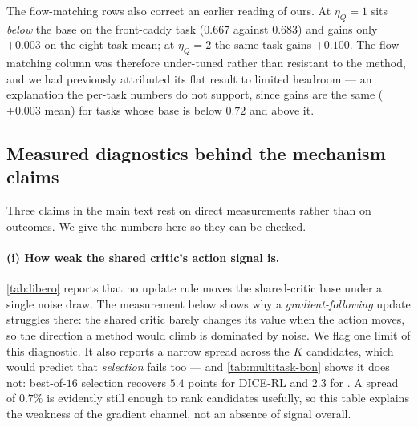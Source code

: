 The flow-matching rows also correct an earlier reading of ours. At
$\eta_Q{=}1$ \method{} sits \emph{below} the base on the front-caddy task
($0.667$ against $0.683$) and gains only $+0.003$ on the eight-task mean; at
$\eta_Q{=}2$ the same task gains $+0.100$. The flow-matching column was
therefore under-tuned rather than resistant to the method, and we had
previously attributed its flat result to limited headroom --- an explanation
the per-task numbers do not support, since gains are the same
($+0.003$ mean) for tasks whose base is below $0.72$ and above it.

\subsection{Measured diagnostics behind the mechanism claims}
\label{app:diagnostics}

Three claims in the main text rest on direct measurements rather than on
outcomes. We give the numbers here so they can be checked.

\paragraph{(i) How weak the shared critic's action signal is.}
\cref{tab:libero} reports that no update rule moves the shared-critic base
under a single noise draw. The measurement below shows why a
\emph{gradient-following} update struggles there: the shared critic barely
changes its value when the action moves, so the direction a method would climb
is dominated by noise. We flag one limit of this diagnostic. It also reports a
narrow spread across the $K$ candidates, which would predict that
\emph{selection} fails too --- and \cref{tab:multitask-bon} shows it does not:
best-of-$16$ selection recovers $5.4$ points for DICE-RL and $2.3$ for
\method{}. A spread of $0.7\%$ is evidently still enough to rank candidates
usefully, so this table explains the weakness of the gradient channel, not an
absence of signal overall.

